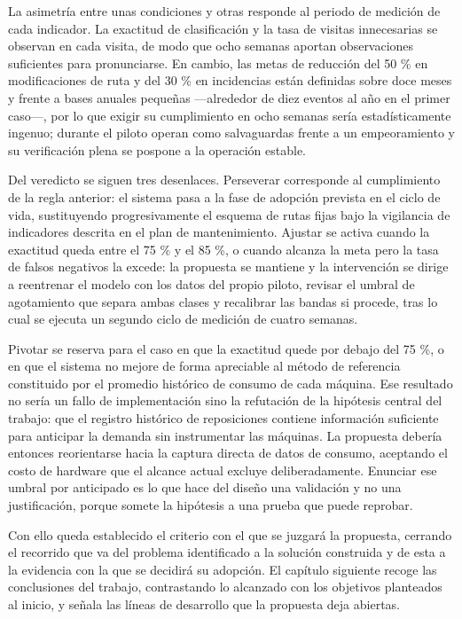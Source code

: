 La asimetría entre unas condiciones y otras responde al periodo de medición de cada indicador. La exactitud de clasificación y la tasa de visitas innecesarias se observan en cada visita, de modo que ocho semanas aportan observaciones suficientes para pronunciarse. En cambio, las metas de reducción del 50 \% en modificaciones de ruta y del 30 \% en incidencias están definidas sobre doce meses y frente a bases anuales pequeñas —alrededor de diez eventos al año en el primer caso—, por lo que exigir su cumplimiento en ocho semanas sería estadísticamente ingenuo; durante el piloto operan como salvaguardas frente a un empeoramiento y su verificación plena se pospone a la operación estable.

Del veredicto se siguen tres desenlaces. Perseverar corresponde al cumplimiento de la regla anterior: el sistema pasa a la fase de adopción prevista en el ciclo de vida, sustituyendo progresivamente el esquema de rutas fijas bajo la vigilancia de indicadores descrita en el plan de mantenimiento. Ajustar se activa cuando la exactitud queda entre el 75 \% y el 85 \%, o cuando alcanza la meta pero la tasa de falsos negativos la excede: la propuesta se mantiene y la intervención se dirige a reentrenar el modelo con los datos del propio piloto, revisar el umbral de agotamiento que separa ambas clases y recalibrar las bandas si procede, tras lo cual se ejecuta un segundo ciclo de medición de cuatro semanas.

Pivotar se reserva para el caso en que la exactitud quede por debajo del 75 \%, o en que el sistema no mejore de forma apreciable al método de referencia constituido por el promedio histórico de consumo de cada máquina. Ese resultado no sería un fallo de implementación sino la refutación de la hipótesis central del trabajo: que el registro histórico de reposiciones contiene información suficiente para anticipar la demanda sin instrumentar las máquinas. La propuesta debería entonces reorientarse hacia la captura directa de datos de consumo, aceptando el costo de hardware que el alcance actual excluye deliberadamente. Enunciar ese umbral por anticipado es lo que hace del diseño una validación y no una justificación, porque somete la hipótesis a una prueba que puede reprobar.

Con ello queda establecido el criterio con el que se juzgará la propuesta, cerrando el recorrido que va del problema identificado a la solución construida y de esta a la evidencia con la que se decidirá su adopción. El capítulo siguiente recoge las conclusiones del trabajo, contrastando lo alcanzado con los objetivos planteados al inicio, y señala las líneas de desarrollo que la propuesta deja abiertas.
